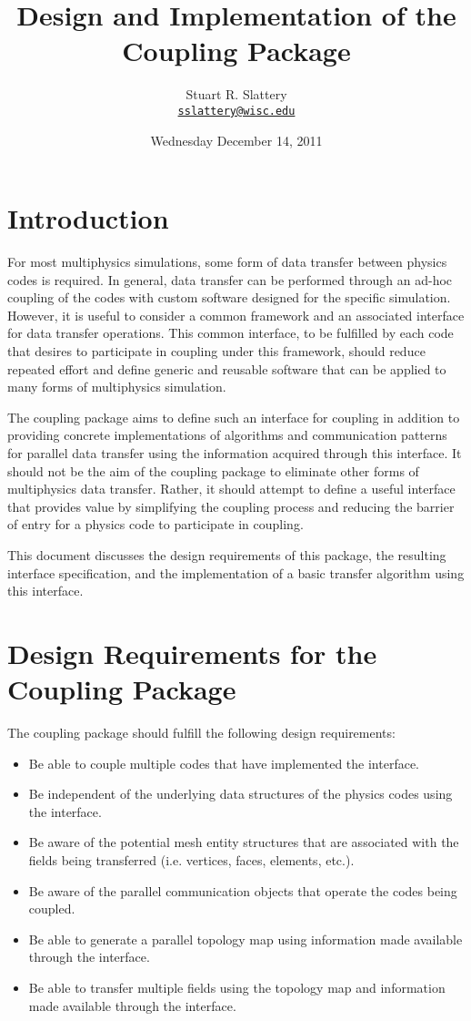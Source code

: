 \documentclass[letterpaper]{article}
\author{Stuart R. Slattery
  \\ \href{mailto:sslattery@wisc.edu}{\texttt{sslattery@wisc.edu}}
}
\date{Wednesday December 14, 2011}
\title{Design and Implementation of the Coupling Package}
\begin{document}
\maketitle

\section{Introduction}
For most multiphysics simulations, some form of data transfer between
physics codes is required. In general, data transfer can be performed
through an ad-hoc coupling of the codes with custom software designed
for the specific simulation. However, it is useful to consider a
common framework and an associated interface for data transfer
operations. This common interface, to be fulfilled by each code that
desires to participate in coupling under this framework, should reduce
repeated effort and define generic and reusable software that can be
applied to many forms of multiphysics simulation.

The coupling package aims to define such an interface for coupling in
addition to providing concrete implementations of algorithms and
communication patterns for parallel data transfer using the
information acquired through this interface. It should not be the aim
of the coupling package to eliminate other forms of multiphysics data
transfer. Rather, it should attempt to define a useful interface that
provides value by simplifying the coupling process and reducing the
barrier of entry for a physics code to participate in coupling. 

This document discusses the design requirements of this package, the
resulting interface specification, and the implementation of a basic
transfer algorithm using this interface.

\section{Design Requirements for the Coupling Package}
The coupling package should fulfill the following design
requirements:

\begin{itemize}
\item Be able to couple multiple codes that have implemented the
  interface.
\item Be independent of the underlying data structures of the physics
  codes using the interface.
\item Be aware of the potential mesh entity structures that are
  associated with the fields being transferred (i.e. vertices, faces,
  elements, etc.).
\item Be aware of the parallel communication objects that operate the
  codes being coupled.
\item Be able to generate a parallel topology map using information
  made available through the interface.
\item Be able to transfer multiple fields using the topology map and
  information made available through the interface.
\end{itemize}
\end{document}
